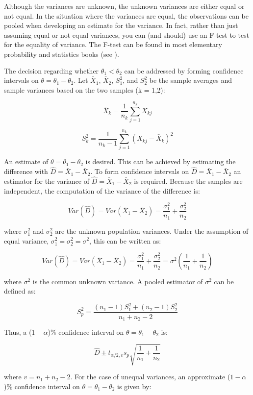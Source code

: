 \documentclass[
]{book}
\theoremstyle{definition}
\theoremstyle{definition}
\theoremstyle{definition}
\theoremstyle{definition}
\theoremstyle{remark}
\begin{document}
Although the variances are unknown, the unknown variances are either
equal or not equal. In the situation where the variances are equal, the
observations can be pooled when developing an estimate for the variance.
In fact, rather than just assuming equal or not equal variances, you can
(and should) use an F-test to test for the equality of variance. The
F-test can be found in most elementary probability and statistics books
(see \citep{montgomery2006applied}).

The decision regarding whether \(\theta_1 < \theta_2\) can be addressed by
forming confidence intervals on \(\theta = \theta_1 - \theta_2\). Let
\(\bar{X}_1\), \(\bar{X}_2\), \(S_1^2\), and \(S_2^2\) be the sample averages
and sample variances based on the two samples (k = 1,2):

\[\bar{X}_k = \dfrac{1}{n_k} \sum_{j=1}^{n_k} X_{kj}\]

\[S_k^2 = \dfrac{1}{n_k - 1} \sum_{j=1}^{n_k} (X_{kj} - \bar{X}_k)^2\]

An estimate of \(\theta = \theta_1 - \theta_2\) is desired. This can be
achieved by estimating the difference with
\(\hat{D} = \bar{X}_1 - \bar{X}_2\). To form confidence intervals on
\(\hat{D} = \bar{X}_1 - \bar{X}_2\) an estimator for the variance of
\(\hat{D} = \bar{X}_1 - \bar{X}_2\) is required. Because the samples are
independent, the computation of the variance of the difference is:

\[Var(\hat{D}) = Var(\bar{X}_1 - \bar{X}_2) = \dfrac{\sigma_1^2}{n_1} + \dfrac{\sigma_2^2}{n_2}\]

where \(\sigma_1^2\) and \(\sigma_2^2\) are the unknown population
variances. Under the assumption of equal variance,
\(\sigma_1^2 = \sigma_2^2 =\sigma^2\), this can be written as:

\[Var(\hat{D}) = Var(\bar{X}_1 - \bar{X}_2) = \dfrac{\sigma_1^2}{n_1} + \dfrac{\sigma_2^2}{n_2} = \sigma^2 (\dfrac{1}{n_1} + \dfrac{1}{n_2})\]

where \(\sigma^2\) is the common unknown variance. A pooled estimator of
\(\sigma^2\) can be defined as:

\[S_p^2 = \dfrac{(n_1 - 1)S_1^2 + (n_2 - 1)S_2^2}{n_1 + n_2 - 2}\]

Thus, a (\(1 - \alpha\))\% confidence interval on
\(\theta = \theta_1 - \theta_2\) is:

\[\hat{D} \pm t_{\alpha/2 , v} s_p \sqrt{\dfrac{1}{n_1} + \dfrac{1}{n_2}}\]

where \(v = n_1 + n_2 - 2\). For the case of unequal variances, an
approximate (\(1 - \alpha\))\% confidence interval on
\(\theta = \theta_1 - \theta_2\) is given by:
\end{document}
